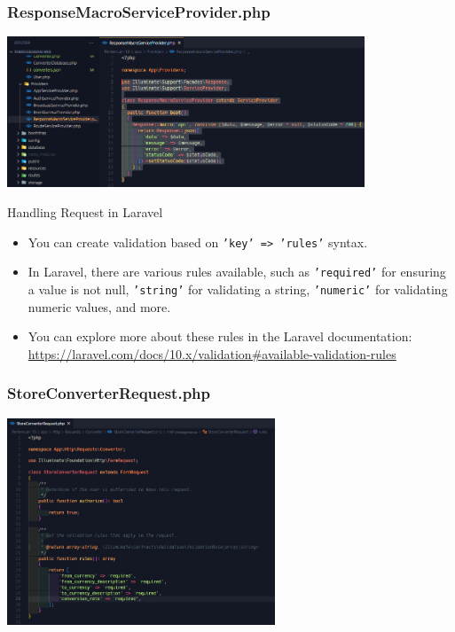 \documentclass[aspectratio=169, table]{beamer}
\begin{document}
\begin{frame}[fragile]
 \frametitle{ResponseMacroServiceProvider.php}
 \vskip1cm
 \begin{center}
  \includegraphics[width=0.8\textwidth]{classFiles/pertemuan-10-custom-response.png}
 \end{center}
\end{frame}

\begin{frame}[fragile]{Handling Request in Laravel}
    \begin{itemize}
        \item You can create validation based on \texttt{'key' => 'rules'} syntax.
        \item In Laravel, there are various rules available, such as \texttt{'required'} for ensuring a value is not null, \texttt{'string'} for validating a string, \texttt{'numeric'} for validating numeric values, and more.
        \item You can explore more about these rules in the Laravel documentation: \url{https://laravel.com/docs/10.x/validation#available-validation-rules}
    \end{itemize}
\end{frame}

\begin{frame}[fragile]
 \frametitle{StoreConverterRequest.php}
 \vskip1cm
 \begin{center}
  \includegraphics[width=0.6\textwidth]{classFiles/pertemuan-10-request-part-1.png}
 \end{center}
\end{frame}
\end{document}
